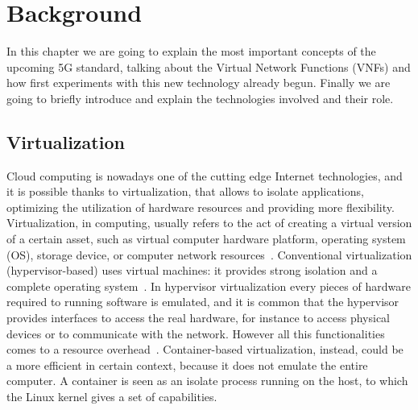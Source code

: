 \chapter{Background}
\label{chap:background}

In this chapter we are going to explain the most important concepts of the 
upcoming 5G standard, talking about the Virtual Network Functions (VNFs) and 
how first experiments with this new technology already begun. Finally we are 
going to briefly introduce and explain the technologies involved and their role.

\section{Virtualization}
Cloud computing is nowadays one of the cutting edge Internet technologies, and
it is possible thanks to virtualization, that allows to isolate applications,
optimizing the utilization of hardware resources and providing more flexibility.
Virtualization, in computing, usually refers to the act of creating a virtual
version of a certain asset, such as virtual computer hardware platform,
operating system (OS), storage device, or computer network
resources~\cite{liu2014research}. Conventional virtualization
(hypervisor-based) uses virtual machines: it provides strong isolation and a
complete operating system~\cite{eder2016hypervisor}. In hypervisor
virtualization every pieces of hardware required to running software is
emulated, and it is common that the hypervisor provides interfaces to access
the real hardware, for instance to access physical devices or to communicate
with the network. However all this functionalities comes to a resource
overhead~\cite{scheepers2014virtualization}. Container-based virtualization,
instead, could be a more efficient in certain context, because it does not
emulate the entire computer. A container is seen as an isolate process running
on the host, to which the Linux kernel gives a set of capabilities.

